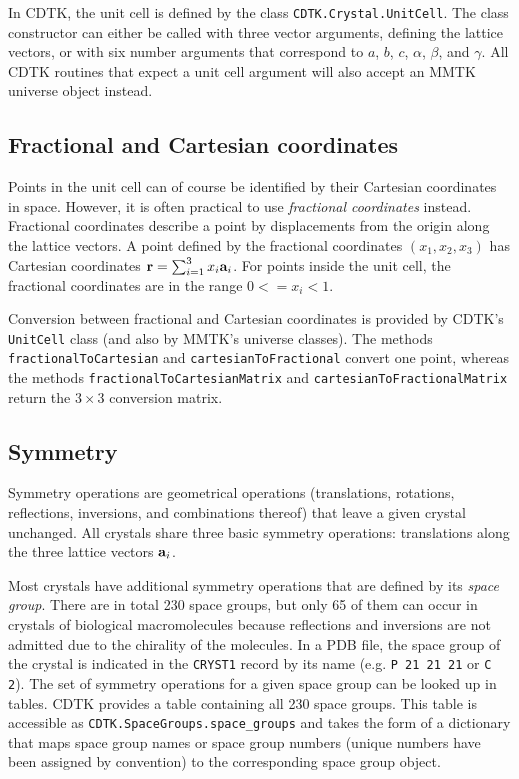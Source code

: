 \documentclass[11pt]{article}
\newcommand{\vect}[1]{{\bf #1}}
\newcommand{\va}{\vect{a}}
\begin{document}
\begin{sloppy}
In CDTK, the unit cell is defined by the class
\texttt{CDTK.Crystal.UnitCell}. The class constructor can either be
called with three vector arguments, defining the lattice vectors, or
with six number arguments that correspond to $a$, $b$, $c$, $\alpha$,
$\beta$, and $\gamma$. All CDTK routines that expect a unit cell
argument will also accept an MMTK universe object instead.

\subsection{Fractional and Cartesian coordinates}

Points in the unit cell can of course be identified by their Cartesian
coordinates in space. However, it is often practical to use
\textit{fractional coordinates} instead. Fractional coordinates
describe a point by displacements from the origin along the lattice
vectors. A point defined by the fractional coordinates $(x_1, x_2, x_3)$
has Cartesian coordinates $\vect{r} = \sum_{i=1}^3 x_i\va_i$.
For points inside the unit cell, the fractional coordinates are in the
range $0 <= x_i < 1$.

Conversion between fractional and Cartesian coordinates is provided by
CDTK's \texttt{UnitCell} class (and also by MMTK's universe classes).
The methods \texttt{fractionalToCartesian} and
\texttt{cartesianToFractional} convert one point, whereas the methods
\texttt{fractionalToCartesianMatrix} and
\texttt{cartesianToFractionalMatrix} return the $3 \times 3$
conversion matrix.

\subsection{Symmetry}

Symmetry operations are geometrical operations (translations,
rotations, reflections, inversions, and combinations thereof) that
leave a given crystal unchanged. All crystals share three basic
symmetry operations: translations along the three lattice vectors
$\va_i$.

Most crystals have additional symmetry operations that are defined by
its \textit{space group}. There are in total 230 space groups, but
only 65 of them can occur in crystals of biological macromolecules
because reflections and inversions are not admitted due to the
chirality of the molecules. In a PDB file, the space group of the
crystal is indicated in the \texttt{CRYST1} record by its name (e.g.
\texttt{P 21 21 21} or \texttt{C 2}). The set of symmetry operations
for a given space group can be looked up in tables. CDTK provides a
table containing all 230 space groups. This table is accessible as
\texttt{CDTK.SpaceGroups.space\_groups} and takes the form of a
dictionary that maps space group names or space group numbers (unique
numbers have been assigned by convention) to the corresponding space
group object.


\end{sloppy}
\end{document}
